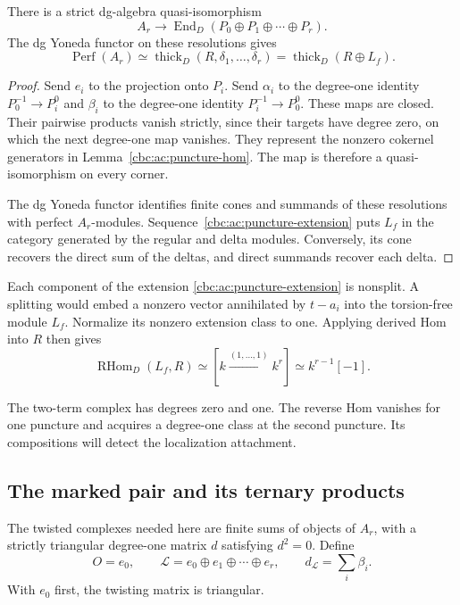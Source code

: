 \begin{theorem}
\label{cbc:ac:star}
There is a strict dg-algebra quasi-isomorphism
\[
 A_r\longrightarrow
           \operatorname{End}_D(P_0\oplus P_1\oplus\cdots\oplus P_r).
\]
The dg Yoneda functor on these resolutions gives
\[
 \operatorname{Perf}(A_r)\simeq
 \operatorname{thick}_D(R,\delta_1,\ldots,\delta_r)
                  =\operatorname{thick}_D(R\oplus L_f).
\]
\end{theorem}
\begin{proof}
Send $e_i$ to the projection onto $P_i$. Send $\alpha_i$
to the degree-one identity $P_0^{-1}\to P_i^0$ and
$\beta_i$ to the degree-one identity $P_i^{-1}\to P_0^0$.
These maps are closed. Their pairwise products vanish
strictly, since their targets have degree zero, on which
the next degree-one map vanishes. They represent the
nonzero cokernel generators in
Lemma~\ref{cbc:ac:puncture-hom}. The map is therefore
a quasi-isomorphism on every corner.

The dg Yoneda functor identifies finite cones and
summands of these resolutions with perfect $A_r$-modules.
Sequence~\eqref{cbc:ac:puncture-extension} puts $L_f$
in the category generated by the regular and delta
modules. Conversely, its cone recovers the direct sum
of the deltas, and direct summands recover each delta.
\end{proof}

Each component of the extension
\eqref{cbc:ac:puncture-extension} is nonsplit.
A splitting would embed a nonzero vector annihilated
by $t-a_i$ into the torsion-free module $L_f$.
Normalize its nonzero extension class to one.
Applying derived Hom into $R$ then gives
\begin{equation}\label{cbc:ac:reverse-localization}
 \operatorname{RHom}_D(L_f,R)
       \simeq[k\xrightarrow{(1,\ldots,1)}k^r]
       \simeq k^{r-1}[-1].
\end{equation}

The two-term complex has degrees zero and one.
The reverse Hom vanishes for one puncture and acquires
a degree-one class at the second puncture.
Its compositions will detect the localization attachment.

\subsection{The marked pair and its ternary products}

The twisted complexes needed here are finite sums of
objects of $A_r$, with a strictly triangular degree-one
matrix $d$ satisfying $d^2=0$. Define
\[
 O=e_0,\qquad
 \mathcal L=e_0\oplus e_1\oplus\cdots\oplus e_r,\qquad
 d_{\mathcal L}=\sum_i\beta_i.
\]
With $e_0$ first, the twisting matrix is triangular.

